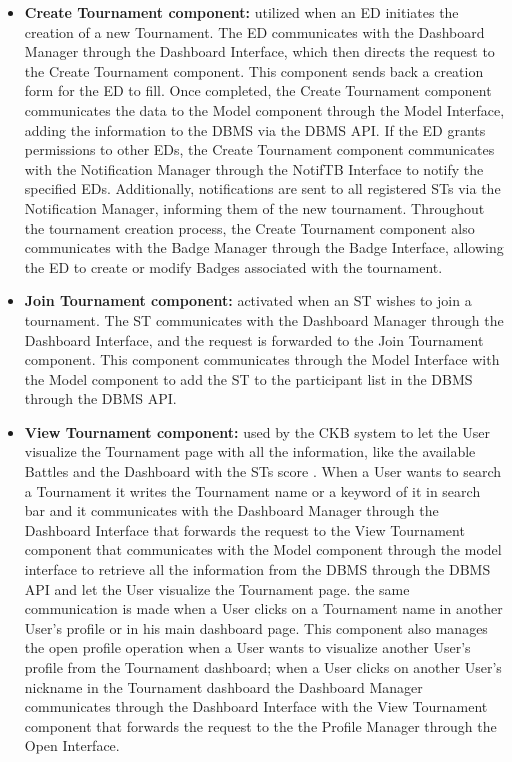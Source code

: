 \begin{itemize}
    \item \textbf{Create Tournament component:} utilized when an ED initiates the creation of a new Tournament. The ED communicates with the Dashboard Manager through the Dashboard Interface, which then directs the request to the Create Tournament component. This component sends back a creation form for the ED to fill. Once completed, the Create Tournament component communicates the data to the Model component through the Model Interface, adding the information to the DBMS via the DBMS API. If the ED grants permissions to other EDs, the Create Tournament component communicates with the Notification Manager through the NotifTB Interface to notify the specified EDs. Additionally, notifications are sent to all registered STs via the Notification Manager, informing them of the new tournament. Throughout the tournament creation process, the Create Tournament component also communicates with the Badge Manager through the Badge Interface, allowing the ED to create or modify Badges associated with the tournament.
    \item \textbf{Join Tournament component:} activated when an ST wishes to join a tournament. The ST communicates with the Dashboard Manager through the Dashboard Interface, and the request is forwarded to the Join Tournament component. This component communicates through the Model Interface with the Model component to add the ST to the participant list in the DBMS through the DBMS API. 
    \item \textbf{View Tournament component:} used by the CKB system to let the User visualize the Tournament page with all the information, like the available Battles and the Dashboard with the STs score . When a User wants to search a Tournament it writes the Tournament name or a keyword of it in search bar and it communicates with the Dashboard Manager through the Dashboard Interface that forwards the request to the View Tournament component that communicates with the Model component through the model interface to retrieve all the information from the DBMS through the DBMS API and let the User visualize the Tournament page. the same communication is made when a User clicks on a Tournament name in another User’s profile or in his main dashboard page. This component also manages the open profile operation when a User wants to visualize another User’s profile from the Tournament dashboard; when a User clicks on another User’s nickname in the Tournament dashboard the Dashboard Manager communicates through the Dashboard Interface with the View Tournament component that forwards the request to the the Profile Manager through the Open Interface.

\end{itemize}
